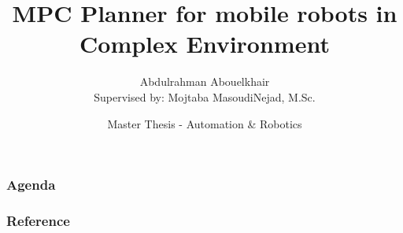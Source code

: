 \documentclass[handout, aspectratio=1610, professionalfonts, 9pt]{beamer}
\title[MPC-Planner]{MPC Planner for mobile robots in Complex Environment}
\author[A.~Abouelkhair]{Abdulrahman Abouelkhair\\ Supervised by: Mojtaba MasoudiNejad, M.Sc.}
\institute[FLW]{\small Lehrstuhl für Förder- und Lagerwesen \\  Fakultät Maschinenbau}
\date[SoSe 2019]{Master Thesis - Automation \& Robotics}
\begin{document}
\maketitle

\begin{frame}
    \frametitle{Agenda}
    \tableofcontents
\end{frame}






%


%




%

% 

\begin{frame}[allowframebreaks]
	\frametitle{Reference}
	\printbibliography
\end{frame}
\end{document}
